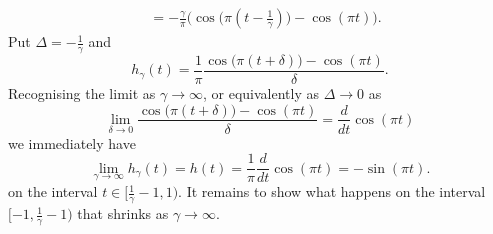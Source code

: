 \begin{excersizelist}
\begin{solution}
\begin{align*}
&= - \frac{\gamma}{\pi} \big( \cos\big(\pi(t - \tfrac{1}{\gamma})\big) - \cos(\pi t) \big).
\end{align*}
Put $\Delta = -\tfrac{1}{\gamma}$ and 
\[
h_\gamma(t) = \frac{1}{\pi} \frac{ \cos\big(\pi(t + \delta)\big) - \cos(\pi t) }{\delta}.
\]
Recognising the limit as $\gamma \to \infty$, or equivalently as $\Delta \to 0$ as
\[
\lim_{\delta \to 0} \frac{ \cos\big(\pi(t + \delta)\big) - \cos(\pi t) }{\delta} = \frac{d}{dt} \cos(\pi t)
\]
we immediately have
\[
\lim_{\gamma \to \infty} h_\gamma(t) = h(t) =\frac{1}{\pi} \frac{d}{dt} \cos(\pi t) = -\sin(\pi t).
\]
on the interval $t \in [\tfrac{1}{\gamma}-1 ,1)$.  It remains to show what happens on the interval $[-1, \tfrac{1}{\gamma}-1)$ that shrinks as $\gamma \to \infty$.

\begin{center}
\newcommand{\hgamma}[1]{\draw[smooth,color=black,thick,dashed,domain=-1+(1.0/#1):1,samples=40] plot function{-(#1/pi)*(cos(pi*(x-(1.0/#1)))-cos(pi*x)) };}
\end{center}


\end{solution}
\end{excersizelist}
